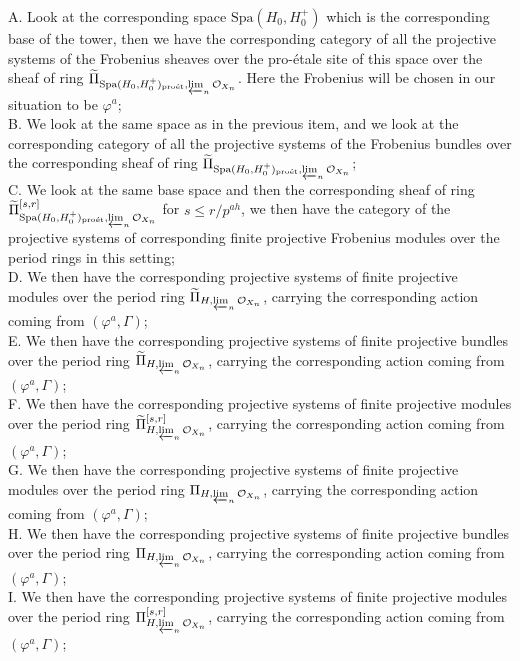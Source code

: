 \documentclass[12pt]{amsart}
\theoremstyle{definition}
\numberwithin{equation}{section}
\begin{document}
\noindent A. Look at the corresponding space $\mathrm{Spa}(H_0,H_0^+)$ which is the corresponding base of the tower, then we have the corresponding category of all the projective systems of the Frobenius sheaves over the pro-\'etale site of this space over the sheaf of ring $\widetilde{\Pi}_{\mathrm{Spa}(H_0,H_0^+)_\text{pro\'et},\varprojlim_n\mathcal{O}_{X_n}}$. Here the Frobenius will be chosen in our situation to be $\varphi^a$;\\
\noindent B. We look at the same space as in the previous item, and we look at the corresponding category of all the projective systems of the Frobenius bundles over the corresponding sheaf of ring $\widetilde{\Pi}_{\mathrm{Spa}(H_0,H_0^+)_\text{pro\'et},\varprojlim_n\mathcal{O}_{X_n}}$;\\
\noindent C. We look at the same base space and then the corresponding sheaf of ring $\widetilde{\Pi}^{[s,r]}_{\mathrm{Spa}(H_0,H_0^+)_\text{pro\'et},\varprojlim_n\mathcal{O}_{X_n}}$ for $s\leq r/p^{ah}$, we then have the category of the projective systems of  corresponding finite projective Frobenius modules over the period rings in this setting;\\
\noindent D. We then have the corresponding projective systems of  finite projective modules over the period ring ${\widetilde{\Pi}}_{H,\varprojlim_n\mathcal{O}_{X_n}}$, carrying the corresponding action coming from $(\varphi^a,\Gamma)$;\\
\noindent E. We then have the corresponding projective systems of finite projective bundles over the period ring ${\widetilde{\Pi}}_{H,\varprojlim_n\mathcal{O}_{X_n}}$, carrying the corresponding action coming from $(\varphi^a,\Gamma)$;\\
\noindent F. We then have the corresponding projective systems of finite projective modules over the period ring ${\widetilde{\Pi}}^{[s,r]}_{H,\varprojlim_n\mathcal{O}_{X_n}}$, carrying the corresponding action coming from $(\varphi^a,\Gamma)$;\\
\noindent G. We then have the corresponding projective systems of finite projective modules over the period ring ${{\Pi}}_{H,\varprojlim_n\mathcal{O}_{X_n}}$, carrying the corresponding action coming from $(\varphi^a,\Gamma)$;\\
\noindent H. We then have the corresponding projective systems of finite projective bundles over the period ring ${{\Pi}}_{H,\varprojlim_n\mathcal{O}_{X_n}}$, carrying the corresponding action coming from $(\varphi^a,\Gamma)$;\\
\noindent I. We then have the corresponding projective systems of finite projective modules over the period ring ${{\Pi}}^{[s,r]}_{H,\varprojlim_n\mathcal{O}_{X_n}}$, carrying the corresponding action coming from $(\varphi^a,\Gamma)$;\\
\end{document}
